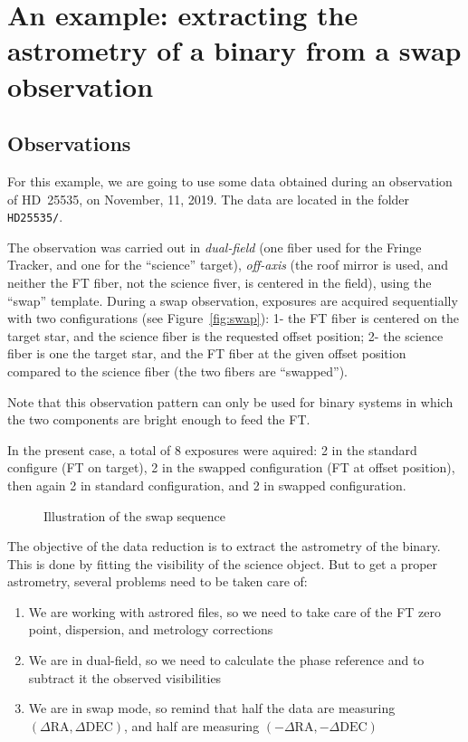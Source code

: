 \section{An example: extracting the astrometry of a binary from a swap observation}
\label{sec:swap_example}

\subsection{Observations}
For this example, we are going to use some data obtained during an observation of HD~25535, on November, 11, 2019. The data are located in the folder \verb|HD25535/|.

The observation was carried out in \emph{dual-field} (one fiber used for the Fringe Tracker, and one for the ``science'' target), \emph{off-axis} (the roof mirror is used, and neither the FT fiber, not the science fiver, is centered in the field), using the ``swap'' template. During a swap observation, exposures are acquired sequentially with two configurations (see Figure~\ref{fig:swap}): 1- the FT fiber is centered on the target star, and the science fiber is the requested offset position; 2- the science fiber is one the target star, and the FT fiber at the given offset position compared to the science fiber (the two fibers are ``swapped'').

Note that this observation pattern can only be used for binary systems in which the two components are bright enough to feed the FT.

In the present case, a total of 8 exposures were aquired: 2 in the standard configure (FT on target), 2 in the swapped configuration (FT at offset position), then again 2 in standard configuration, and 2 in swapped configuration.

\begin{figure}
  \begin{center}
    \caption{Illustration of the swap sequence}
  \end{center}
\end{figure}

The objective of the data reduction is to extract the astrometry of the binary. This is done by fitting the visibility of the science object. But to get a proper astrometry, several problems need to be taken care of:
\begin{enumerate}
\item{We are working with astrored files, so we need to take care of the FT zero point, dispersion, and metrology corrections}
\item{We are in dual-field, so we need to calculate the phase reference and to subtract it the observed visibilities}
\item{We are in swap mode, so remind that half the data are measuring $(\Delta\mathrm{RA},\Delta{}\mathrm{DEC})$, and half are measuring $(-\Delta\mathrm{RA},-\Delta{}\mathrm{DEC})$}
\end{enumerate}

